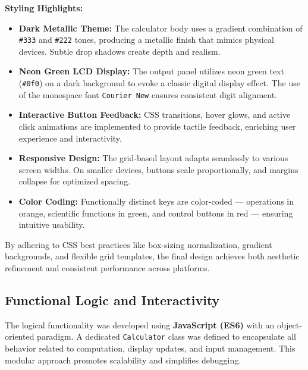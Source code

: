 \documentclass[a4paper,12pt,oneside]{report}
\numberwithin{equation}{chapter}
\numberwithin{figure}{chapter}
\numberwithin{table}{chapter}
\begin{document}
\textbf{Styling Highlights:}
\begin{itemize}
    \item \textbf{Dark Metallic Theme:} The calculator body uses a gradient combination of \texttt{\#333} and \texttt{\#222} tones, producing a metallic finish that mimics physical devices. Subtle drop shadows create depth and realism.
    \item \textbf{Neon Green LCD Display:} The output panel utilizes neon green text (\texttt{\#0f0}) on a dark background to evoke a classic digital display effect. The use of the monospace font \texttt{Courier New} ensures consistent digit alignment.
    \item \textbf{Interactive Button Feedback:} CSS transitions, hover glows, and active click animations are implemented to provide tactile feedback, enriching user experience and interactivity.
    \item \textbf{Responsive Design:} The grid-based layout adapts seamlessly to various screen widths. On smaller devices, buttons scale proportionally, and margins collapse for optimized spacing.
    \item \textbf{Color Coding:} Functionally distinct keys are color-coded — operations in orange, scientific functions in green, and control buttons in red — ensuring intuitive usability.
\end{itemize}

By adhering to CSS best practices like box-sizing normalization, gradient backgrounds, and flexible grid templates, the final design achieves both aesthetic refinement and consistent performance across platforms.

\subsection{Functional Logic and Interactivity}

The logical functionality was developed using \textbf{JavaScript (ES6)} with an object-oriented paradigm. A dedicated \texttt{Calculator} class was defined to encapsulate all behavior related to computation, display updates, and input management. This modular approach promotes scalability and simplifies debugging.
\end{document}
